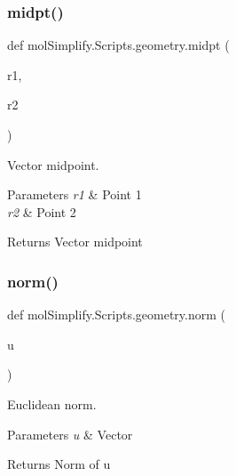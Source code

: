 \subsubsection{\texorpdfstring{midpt()}{midpt()}}
{\footnotesize\ttfamily def mol\+Simplify.\+Scripts.\+geometry.\+midpt (\begin{DoxyParamCaption}\item[{}]{r1,  }\item[{}]{r2 }\end{DoxyParamCaption})}



Vector midpoint. 


\begin{DoxyParams}{Parameters}
{\em r1} & Point 1 \\
\hline
{\em r2} & Point 2 \\
\hline
\end{DoxyParams}
\begin{DoxyReturn}{Returns}
Vector midpoint 
\end{DoxyReturn}
\mbox{\label{namespacemolSimplify_1_1Scripts_1_1geometry_ab22dfc9103deb322f3fe52878f24aec9}} 
\subsubsection{\texorpdfstring{norm()}{norm()}}
{\footnotesize\ttfamily def mol\+Simplify.\+Scripts.\+geometry.\+norm (\begin{DoxyParamCaption}\item[{}]{u }\end{DoxyParamCaption})}



Euclidean norm. 


\begin{DoxyParams}{Parameters}
{\em u} & Vector \\
\hline
\end{DoxyParams}
\begin{DoxyReturn}{Returns}
Norm of u 
\end{DoxyReturn}
\mbox{\label{namespacemolSimplify_1_1Scripts_1_1geometry_a6b3a18a3eb0c01b23c6acb6f374e1850}} 
